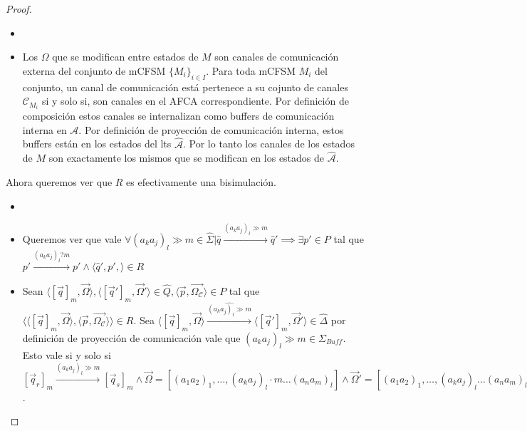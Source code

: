 \begin{proof}
\begin{itemize}
    \item[{$\overrightarrow{\Omega} = \overrightarrow{\Omega_\mathcal{C}}$} $\impliedby$]
    \item Los $\Omega$ que se modifican entre estados de $M$ son canales de comunicación externa del conjunto de mCFSM $\{M_i\}_{i \in I}$. Para toda mCFSM $M_i$ del conjunto, un canal de comunicación está pertenece a su cojunto de canales $\mathcal{C}_{M_i}$ si y solo si, son canales en el AFCA correspondiente. Por definición de composición estos canales se internalizan como buffers de comunicación interna en $\mathcal{A}$. Por definición de proyección de comunicación interna, estos buffers están en los estados del lts $\hat{\mathcal{A}}$. Por lo tanto los canales de los estados de $M$ son exactamente los mismos que se modifican en los estados de $\hat{\mathcal{A}}$.
\end{itemize}

Ahora queremos ver que $R$ es efectivamente una bisimulación.

\begin{itemize}
    \item[\textbf{R} $\implies$]
    \item[] Queremos ver que vale $\forall (a_ka_j)_l \gg m \in \hat{\Sigma} | \hat{q} \xrightarrow{(a_ka_j)_l \gg m} \hat{q}' \implies \exists p' \in P$ tal que $p' \xrightarrow{(a_ka_j)_l?m} p' \land \langle \hat{q}', p', \rangle \in R$
 
    \item[i] Sean $\langle [\overrightarrow{q}]_m, \overrightarrow{\Omega} \rangle, \langle [\overrightarrow{q}']_m, \overrightarrow{\Omega}' \rangle \in \hat{Q}, \langle \overrightarrow{p}, \overrightarrow{\Omega_\mathcal{C}} \rangle \in P$ tal que $\langle \langle [\overrightarrow{q}]_m, \overrightarrow{\Omega} \rangle, \langle \overrightarrow{p}, \overrightarrow{\Omega_\mathcal{C}} \rangle \rangle \in R$. Sea $\langle [\overrightarrow{q}]_m, \overrightarrow{\Omega} \rangle \xrightarrow{\hat{(a_ka_j)_l \gg m}} \langle [\overrightarrow{q}']_m, \overrightarrow{\Omega}' \rangle \in \hat{\Delta}$ por definición de proyección de comunicación vale que $(a_ka_j)_l \gg m \in \Sigma_{Buff}$.  Esto vale si y solo si $[\overrightarrow{q}_r]_m \xrightarrow{(a_ka_j)_l \gg m} [\overrightarrow{q}_s]_m \land \overrightarrow{\Omega} = [(a_1a_2)_1, \ldots, (a_ka_j)_l \cdot m \ldots (a_na_m)_l] \land \overrightarrow{\Omega}' = [(a_1a_2)_1, \ldots, (a_ka_j)_l \ldots (a_na_m)_l] \rangle \land \overrightarrow{q} \in [\overrightarrow{q}]_m \land \overrightarrow{q}' \in [\overrightarrow{q}]_m$.
    

\end{itemize}
\end{proof}
